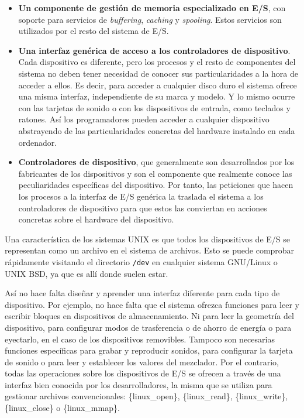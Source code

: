 \begin{itemize}
\item
  \textbf{Un componente de gestión de memoria especializado en E/S}, con
  soporte para servicios de \emph{buffering}, \emph{caching} y
  \emph{spooling}. Estos servicios son utilizados por el resto del
  sistema de E/S.
\item
  \textbf{Una interfaz genérica de acceso a los controladores de
  dispositivo}. Cada dispositivo es diferente, pero los procesos y el
  resto de componentes del sistema no deben tener necesidad de conocer
  sus particularidades a la hora de acceder a ellos. Es decir, para
  acceder a cualquier disco duro el sistema ofrece una misma interfaz,
  independiente de su marca y modelo. Y lo mismo ocurre con las tarjetas
  de sonido o con los dispositivos de entrada, como teclados y ratones.
  Así los programadores pueden acceder a cualquier dispositivo
  abstrayendo de las particularidades concretas del hardware instalado
  en cada ordenador.
\item
  \textbf{Controladores de dispositivo}, que generalmente son
  desarrollados por los fabricantes de los dispositivos y son el
  componente que realmente conoce las peculiaridades específicas del
  dispositivo. Por tanto, las peticiones que hacen los procesos a la
  interfaz de E/S genérica la traslada el sistema a los controladores de
  dispositivo para que estos las conviertan en acciones concretas sobre
  el hardware del dispositivo.
\end{itemize}

Una característica de los sistemas UNIX es que todos los dispositivos de
E/S se representan como un archivo en el sistema de archivos. Esto se
puede comprobar rápidamente visitando el directorio \texttt{/dev} en
cualquier sistema GNU/Linux o UNIX BSD, ya que es allí donde suelen
estar.

Así no hace falta diseñar y aprender una interfaz diferente para cada
tipo de dispositivo. Por ejemplo, no hace falta que el sistema ofrezca
funciones para leer y escribir bloques en dispositivos de
almacenamiento. Ni para leer la geometría del dispositivo, para
configurar modos de trasferencia o de ahorro de energía o para
eyectarlo, en el caso de los dispositivos removibles. Tampoco son
necesarias funciones específicas para grabar y reproducir sonidos, para
configurar la tarjeta de sonido o para leer y establecer los valores del
mezclador. Por el contrario, todas las operaciones sobre los
dispositivos de E/S se ofrecen a través de una interfaz bien conocida
por los desarrolladores, la misma que se utiliza para gestionar archivos
convencionales: \{linux\_open\}, \{linux\_read\}, \{linux\_write\},
\{linux\_close\} o \{linux\_mmap\}.

